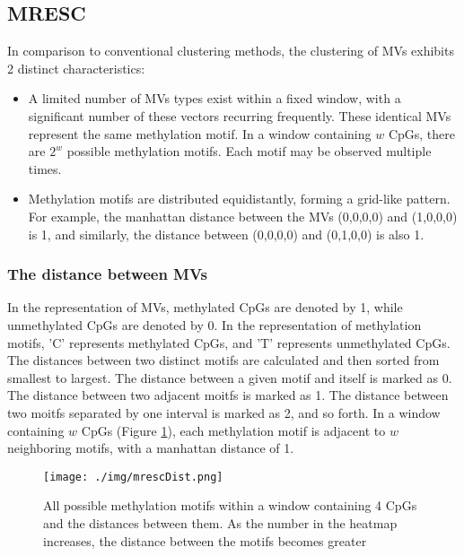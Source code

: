 \documentclass[12pt,letterpaper]{article}
\begin{document}
\subsection{MRESC}

In comparison to conventional clustering methods, the clustering of MVs exhibits 2 distinct 
characteristics:

\begin{itemize}
    \item  A limited number of MVs types exist within a fixed window, with a significant number 
    of these vectors recurring frequently. These identical MVs represent the same methylation 
    motif. In a window containing $w$ CpGs, there are $2^w$ possible methylation motifs. Each 
    motif may be observed multiple times. 
    \item  Methylation motifs are distributed equidistantly, forming a grid-like pattern. For 
    example, the manhattan distance between the MVs (0,0,0,0) and (1,0,0,0) is 1, and similarly,
    the distance between (0,0,0,0) and (0,1,0,0) is also 1.
\end{itemize}

\subsubsection{The distance between MVs}

In the representation of MVs, methylated CpGs are denoted by 1, while unmethylated CpGs are denoted 
by 0. In the representation of methylation motifs, 'C' represents methylated CpGs, and 'T' 
represents unmethylated CpGs. The distances between two distinct motifs are calculated and then 
sorted from smallest to largest. The distance between a given motif and itself is marked as 0. The 
distance between two adjacent moitfs is marked as 1. The distance between two moitfs separated by 
one interval is marked as 2, and so forth. In a window containing $w$ CpGs (Figure \ref*{fig:MRESC}), 
each methylation motif is adjacent to $w$ neighboring motifs, with a manhattan distance of 1.

\begin{figure}[H]
    \centering
    \texttt{[image: ./img/mrescDist.png]}
    \caption{
        All possible methylation motifs within a window containing 4 CpGs and the 
        distances between them. As the number in the heatmap increases, the distance 
        between the motifs becomes greater
    }
    \label{fig:MRESC}
\end{figure}
\end{document}

